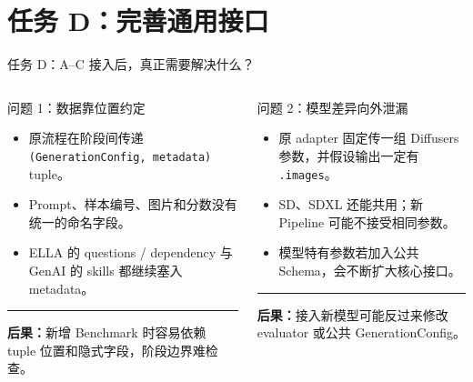 \documentclass[aspectratio=169,10pt]{beamer}
\begin{document}
\section{任务 D：完善通用接口}
\begin{frame}{任务 D：A--C 接入后，真正需要解决什么？}
  \begin{columns}[T,onlytextwidth]
      \begin{block}{问题 1：数据靠位置约定}
        \begin{minipage}[c][4.65cm][c]{\linewidth}
          \begin{itemize}\scriptsize
            \item 原流程在阶段间传递 \texttt{(GenerationConfig, metadata)} tuple。
            \item Prompt、样本编号、图片和分数没有统一的命名字段。
            \item ELLA 的 questions / dependency 与 GenAI 的 skills 都继续塞入 metadata。
          \end{itemize}
          \vspace{0.35em}
          \color{T2IGray}\rule{\linewidth}{0.35pt}\par\vspace{0.25em}
          \scriptsize\textbf{后果：}新增 Benchmark 时容易依赖 tuple 位置和隐式字段，阶段边界难检查。
        \end{minipage}
      \end{block}
      \begin{block}{问题 2：模型差异向外泄漏}
        \begin{minipage}[c][4.65cm][c]{\linewidth}
          \begin{itemize}\scriptsize
            \item 原 adapter 固定传一组 Diffusers 参数，并假设输出一定有 \texttt{.images}。
            \item SD、SDXL 还能共用；新 Pipeline 可能不接受相同参数。
            \item 模型特有参数若加入公共 Schema，会不断扩大核心接口。
          \end{itemize}
          \vspace{0.35em}
          \color{T2IGray}\rule{\linewidth}{0.35pt}\par\vspace{0.25em}
          \scriptsize\textbf{后果：}接入新模型可能反过来修改 evaluator 或公共 GenerationConfig。
        \end{minipage}

\end{block}
\end{columns}
\end{frame}
\end{document}
